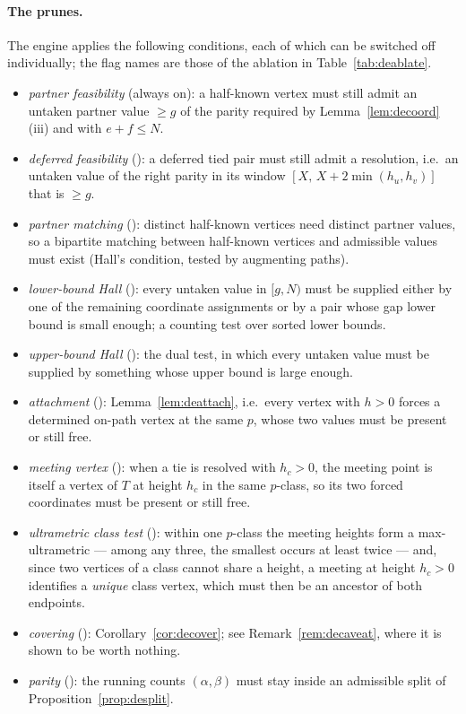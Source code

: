 \paragraph{The prunes.}
The engine applies the following conditions, each of which can be switched off
individually; the flag names are those of the ablation in
Table~\ref{tab:deablate}.
\begin{itemize}\itemsep2pt
\item \emph{partner feasibility} (always on): a half-known vertex must still
admit an untaken partner value $\ge g$ of the parity required by
Lemma~\ref{lem:decoord}(iii) and with $e+f\le N$.
\item \emph{deferred feasibility} (): a deferred
tied pair must still admit a resolution, i.e.\ an untaken value of the right
parity in its window $[X,\,X+2\min(h_u,h_v)]$ that is $\ge g$.
\item \emph{partner matching} (): distinct half-known vertices
need distinct partner values, so a bipartite matching between half-known
vertices and admissible values must exist (Hall's condition, tested by
augmenting paths).
\item \emph{lower-bound Hall} (): every untaken value in $[g,N)$
must be supplied either by one of the remaining coordinate assignments or by a
pair whose gap lower bound is small enough; a counting test over sorted lower
bounds.
\item \emph{upper-bound Hall} (): the dual test, in which every
untaken value must be supplied by something whose upper bound is large enough.
\item \emph{attachment} (): Lemma~\ref{lem:deattach}, i.e.\
every vertex with $h>0$ forces a determined on-path vertex at the same $p$,
whose two values must be present or still free.
\item \emph{meeting vertex} (): when a tie is resolved with
$h_c>0$, the meeting point is itself a vertex of $T$ at height $h_c$ in the same
$p$-class, so its two forced coordinates must be present or still free.
\item \emph{ultrametric class test} (\tok{--no-ultra}): within one $p$-class the
meeting heights form a max-ultrametric --- among any three, the smallest occurs
at least twice --- and, since two vertices of a class cannot share a height, a
meeting at height $h_c>0$ identifies a \emph{unique} class vertex, which must
then be an ancestor of both endpoints.
\item \emph{covering} (): Corollary~\ref{cor:decover}; see
Remark~\ref{rem:decaveat}, where it is shown to be worth nothing.
\item \emph{parity} (\tok{--no-parity}): the running counts
$(\alpha,\beta)$ must stay inside an admissible split of
Proposition~\ref{prop:desplit}.
\end{itemize}

